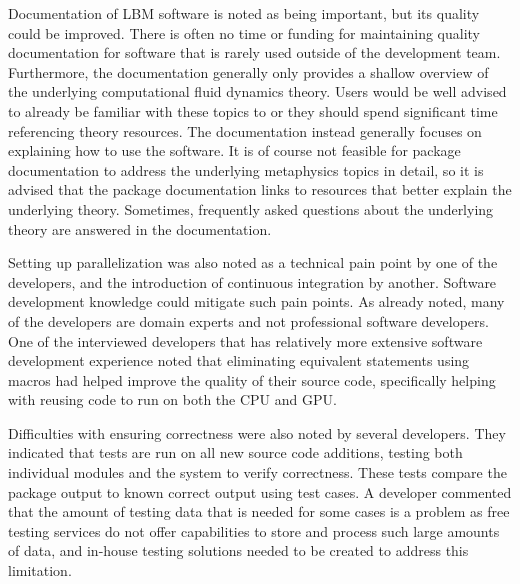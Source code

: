 \documentclass[12pt, notitlepage]{article}
\begin{document}
Documentation of LBM software is noted as being important, but its quality could be improved. There is often no time or funding for maintaining quality documentation for software that is rarely used outside of the development team. Furthermore, the documentation generally only provides a shallow overview of the underlying computational fluid dynamics theory. Users would be well advised to already be familiar with these topics to or they should spend significant time referencing theory resources. The documentation instead generally focuses on explaining how to use the software. It is of course not feasible for package documentation to address the underlying metaphysics topics in detail, so it is advised that the package documentation links to resources that better explain the underlying theory. Sometimes, frequently asked questions about the underlying theory are answered in the documentation.

Setting up parallelization was also noted as a technical pain point by one of the developers, and the introduction of continuous integration by another. Software development knowledge could mitigate such pain points. As already noted, many of the developers are domain experts and not professional software developers. One of the interviewed developers that has relatively more extensive software development experience noted that eliminating equivalent statements using macros had helped improve the quality of their source code, specifically helping with reusing code to run on both the CPU and GPU. 

Difficulties with ensuring correctness were also noted by several developers. They indicated that tests are run on all new source code additions, testing both individual modules and the system to verify correctness. These tests compare the package output to known correct output using test cases. A developer commented that the amount of testing data that is needed for some cases is a problem as free testing services do not offer capabilities to store and process such large amounts of data, and in-house testing solutions needed to be created to address this limitation.
\end{document}
